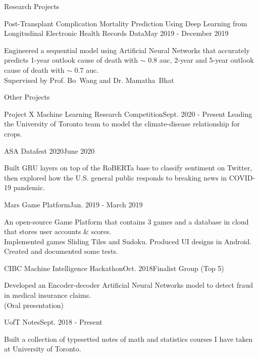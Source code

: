 \documentclass{resume} %
\begin{document}
\begin{rSection}{Research Projects}
	\begin{rSubsection}{Post-Transplant Complication Mortality Prediction Using Deep Learning from Longitudinal Electronic Health Records Data}{May 2019 - December 2019}{}{}
		\item
		Engineered a sequential model using Artificial Neural Networks that accurately predicts 1-year outlook cause of death with $\sim$ 0.8 auc, 2-year and 5-year outlook cause of death with $\sim$ 0.7 auc. \\
		Supervised by Prof. Bo~Wang and Dr. Mamatha~Bhat
	\end{rSubsection}
\end{rSection}

\begin{rSection}{Other Projects}
	\begin{rSubsection}{Project X Machine Learning Research Competition}{Sept. 2020 - Present}{}{}
	Leading the University of Toronto team to model the climate-disease relationship for crops.
	\end{rSubsection}
	\begin{rSubsection}{ASA Datafest 2020}{June 2020}{}{}
		\item Built GRU layers on top of the RoBERTa base to classify sentiment on Twitter, then explored how the U.S. general public responds to breaking news in COVID-19 pandemic.
	\end{rSubsection}

	\begin{rSubsection}{Mars Game Platform}{Jan. 2019 - March 2019}{}{}
		\item 
		An open-source Game Platform that contains 3 games and a database in cloud that stores user accounts \& scores.\\
		Implemented games Sliding Tiles and Sudoku. Produced UI designs in Android. Created and documented some tests.
	\end{rSubsection}
	\begin{rSubsection}{CIBC Machine Intelligence Hackathon}{Oct. 2018}{Finalist Group (Top 5)}{}
		\item 
		Developed an Encoder-decoder Artificial Neural Networks model to detect fraud in medical insurance claims.\\
		(Oral presentation)
	\end{rSubsection}
	\begin{rSubsection}{UofT Notes}{Sept. 2018 - Present}{}{}
		\item
		Built a collection of typesetted notes of math and statistics courses I have taken at University of Toronto.
	\end{rSubsection}
\end{rSection}
\end{document}
